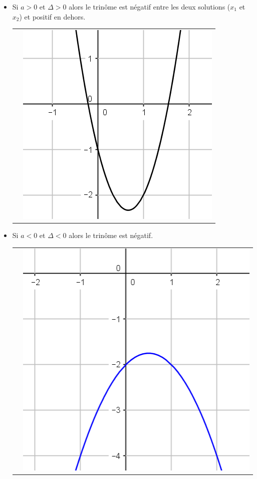 \documentclass[12pt,a4paper]{article}
\begin{document}
\begin{itemize}
				\item 
				Si $a > 0$ et $\Delta > 0$ alors le trinôme est négatif entre les deux solutions ($x_1$ et $x_2$) et positif en dehors.
				
				\begin{tabular}{ll }
					 &
					
					\includegraphics[scale=0.25]{./img/fig_3}\\
				\end{tabular}
				
				\item 
				Si $a < 0$ et $\Delta < 0$ alors le trinôme est négatif.
				
				\begin{tabular}{ll }
					 &
					
					\includegraphics[scale=0.25]{./img/fig_6}\\
				\end{tabular}
				

\end{itemize}
\end{document}

